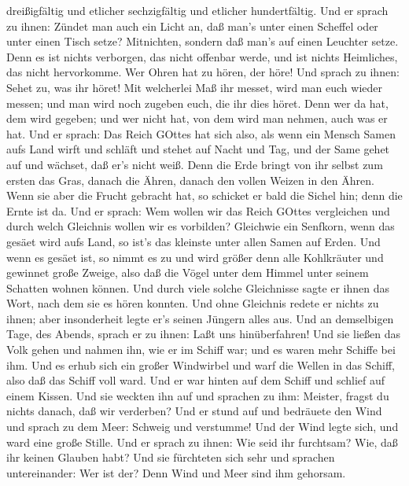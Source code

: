 dreißigfältig und etlicher sechzigfältig und etlicher hundertfältig.
 Und er sprach zu ihnen: Zündet man auch ein Licht an, daß
man's unter einen Scheffel oder unter einen Tisch setze? Mitnichten,
sondern daß man's auf einen Leuchter setze.  Denn es ist
nichts verborgen, das nicht offenbar werde, und ist nichts Heimliches,
das nicht hervorkomme.  Wer Ohren hat zu hören, der höre!
 Und sprach zu ihnen: Sehet zu, was ihr höret! Mit
welcherlei Maß ihr messet, wird man euch wieder messen; und man wird
noch zugeben euch, die ihr dies höret.  Denn wer da hat,
dem wird gegeben; und wer nicht hat, von dem wird man nehmen, auch was
er hat.  Und er sprach: Das Reich GOttes hat sich also, als
wenn ein Mensch Samen aufs Land wirft  und schläft und
stehet auf Nacht und Tag, und der Same gehet auf und wächset, daß er's
nicht weiß.  Denn die Erde bringt von ihr selbst zum ersten
das Gras, danach die Ähren, danach den vollen Weizen in den Ähren.
 Wenn sie aber die Frucht gebracht hat, so schicket er bald
die Sichel hin; denn die Ernte ist da.  Und er sprach: Wem
wollen wir das Reich GOttes vergleichen und durch welch Gleichnis wollen
wir es vorbilden?  Gleichwie ein Senfkorn, wenn das gesäet
wird aufs Land, so ist's das kleinste unter allen Samen auf Erden.
 Und wenn es gesäet ist, so nimmt es zu und wird größer
denn alle Kohlkräuter und gewinnet große Zweige, also daß die Vögel
unter dem Himmel unter seinem Schatten wohnen können.  Und
durch viele solche Gleichnisse sagte er ihnen das Wort, nach dem sie es
hören konnten.  Und ohne Gleichnis redete er nichts zu
ihnen; aber insonderheit legte er's seinen Jüngern alles aus.
 Und an demselbigen Tage, des Abends, sprach er zu ihnen:
Laßt uns hinüberfahren!  Und sie ließen das Volk gehen und
nahmen ihn, wie er im Schiff war; und es waren mehr Schiffe bei ihm.
 Und es erhub sich ein großer Windwirbel und warf die
Wellen in das Schiff, also daß das Schiff voll ward.  Und
er war hinten auf dem Schiff und schlief auf einem Kissen. Und sie
weckten ihn auf und sprachen zu ihm: Meister, fragst du nichts danach,
daß wir verderben?  Und er stund auf und bedräuete den Wind
und sprach zu dem Meer: Schweig und verstumme! Und der Wind legte sich,
und ward eine große Stille.  Und er sprach zu ihnen: Wie
seid ihr furchtsam? Wie, daß ihr keinen Glauben habt?  Und
sie fürchteten sich sehr und sprachen untereinander: Wer ist der? Denn
Wind und Meer sind ihm gehorsam.

